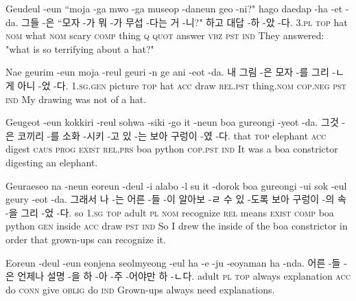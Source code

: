 \begin{example}
\tgl
		{Geudeul -eun ``moja -ga mwo -ga museop -daneun geo -ni?" hago daedap -ha -et -da.}
		{그들 -은 ``모자 -가 뭐 -가 무섭 -다는 거 -니?" 하고 대답 -하 -았 -다.}
		{\textsc{3.pl} \textsc{top} hat \textsc{nom} what \textsc{nom} scary \textsc{comp} thing \textsc{q} \textsc{quot} answer \textsc{vbz} \textsc{pst} \textsc{ind}}
		{They answered: "what is so terrifying about a hat?"}
\end{example}

\begin{example}
\tgl
		{Nae geurim -eun moja -reul geuri -n ge ani -eot -da.}
		{내 그림 -은 모자 -를 그리 -ㄴ 게 아니 -었 -다.}
		{\textsc{1.sg.gen} picture \textsc{top} hat \textsc{acc} draw \textsc{rel.pst} thing.\textsc{nom} \textsc{cop.neg} \textsc{pst} \textsc{ind}}
		{My drawing was not of a hat.}
\end{example}

\begin{example}
\tgl
		{Geugeot -eun kokkiri -reul sohwa -siki -go it -neun boa gureongi -yeot -da.}
		{그것 -은 코끼리 -를 소화 -시키 -고 있 -는 보아 구렁이 -였 -다.}
		{that \textsc{top} elephant \textsc{acc} digest \textsc{caus} \textsc{prog} \textsc{exist} \textsc{rel.prs} boa python \textsc{cop.pst} \textsc{ind}}
		{It was a boa constrictor digesting an elephant.}
\end{example}

\begin{example}
\tgl
		{Geuraeseo na -neun eoreun -deul -i alabo -l su it -dorok boa gureongi -ui sok -eul geury -eot -da.}
		{그래서 나 -는 어른 -들 -이 알아보 -ㄹ 수 있 -도록 보아 구렁이 -의 속 -을 그리 -었 -다.}
		{so \textsc{1.sg} \textsc{top} adult \textsc{pl} \textsc{nom} recognize \textsc{rel} means \textsc{exist} \textsc{comp} boa python \textsc{gen} inside \textsc{acc} draw \textsc{pst} \textsc{ind}}
		{So I drew the inside of the boa constrictor in order that grown-ups can recognize it.}
\end{example}

\begin{example}
\tgl
		{Eoreun -deul -eun eonjena seolmyeong -eul ha -e -ju -eoyaman ha -nda.}
		{어른 -들 -은 언제나 설명 -을 하 -아 -주 -어야만 하 -ㄴ다.}
		{adult \textsc{pl} \textsc{top} always explanation \textsc{acc} do \textsc{conn} give \textsc{oblig} do \textsc{ind}}
		{Grown-ups always need explanations.}
\end{example}

